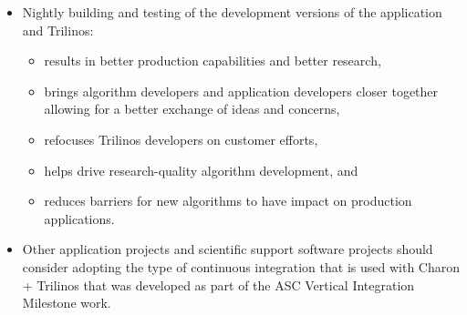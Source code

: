 \documentclass[pdf,ps2pdf,11pt]{SANDreport}
\begin{document}
\begin{itemize}

{}\item Nightly building and testing of the development versions of the
application and Trilinos:

  \begin{itemize}

  {}\item results in better production capabilities and better research,

  {}\item brings algorithm developers and application developers closer
  together allowing for a better exchange of ideas and concerns,

  {}\item refocuses Trilinos developers on customer efforts,

  {}\item helps drive research-quality algorithm development, and
        
  {}\item reduces barriers for new algorithms to have impact on production
  applications.

  \end{itemize}

{}\item Other application projects and scientific support software projects
should consider adopting the type of continuous integration that is used with
Charon + Trilinos that was developed as part of the ASC Vertical Integration
Milestone work.

\end{itemize}

%
\clearpage



%
%

\end{document}
